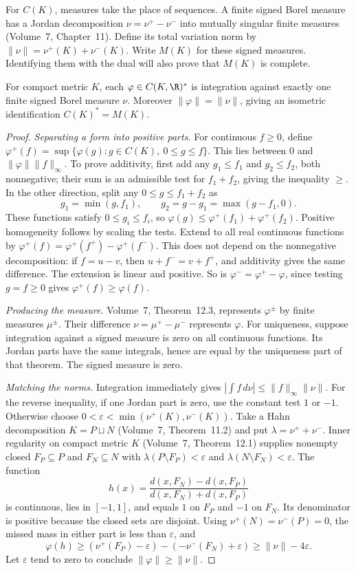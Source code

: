 For $C(K)$, measures take the place of sequences. A finite signed Borel measure has a Jordan decomposition $\nu=\nu^+-\nu^-$ into mutually singular finite measures (Volume~7, Chapter~11). Define its total variation norm by $\|\nu\|=\nu^+(K)+\nu^-(K)$. Write $M(K)$ for these signed measures. Identifying them with the dual will also prove that $M(K)$ is complete.

\begin{theorem}\label{thm:rieszmarkov}
For compact metric $K$, each $\varphi\in C(K,\R)^*$ is integration against exactly one finite signed Borel measure $\nu$. Moreover $\|\varphi\|=\|\nu\|$, giving an isometric identification $C(K)^*=M(K)$.
\end{theorem}
\begin{proof}
\emph{Separating a form into positive parts.} For continuous $f\ge0$, define $\varphi^+(f)=\sup\{\varphi(g):g\in C(K),\ 0\le g\le f\}$. This lies between $0$ and $\|\varphi\|\|f\|_\infty$. To prove additivity, first add any $g_1\le f_1$ and $g_2\le f_2$, both nonnegative; their sum is an admissible test for $f_1+f_2$, giving the inequality $\ge$. In the other direction, split any $0\le g\le f_1+f_2$ as
\[g_1=\min(g,f_1),\qquad g_2=g-g_1=\max(g-f_1,0).\]
These functions satisfy $0\le g_i\le f_i$, so $\varphi(g)\le\varphi^+(f_1)+\varphi^+(f_2)$. Positive homogeneity follows by scaling the tests. Extend to all real continuous functions by $\varphi^+(f)=\varphi^+(f^+)-\varphi^+(f^-)$. This does not depend on the nonnegative decomposition: if $f=u-v$, then $u+f^-=v+f^+$, and additivity gives the same difference. The extension is linear and positive. So is $\varphi^-=\varphi^+-\varphi$, since testing $g=f\ge0$ gives $\varphi^+(f)\ge\varphi(f)$.

\emph{Producing the measure.} Volume~7, Theorem~12.3, represents $\varphi^\pm$ by finite measures $\mu^\pm$. Their difference $\nu=\mu^+-\mu^-$ represents $\varphi$. For uniqueness, suppose integration against a signed measure is zero on all continuous functions. Its Jordan parts have the same integrals, hence are equal by the uniqueness part of that theorem. The signed measure is zero.

\emph{Matching the norms.} Integration immediately gives $|\int f\,d\nu|\le\|f\|_\infty\|\nu\|$. For the reverse inequality, if one Jordan part is zero, use the constant test $1$ or $-1$. Otherwise choose $0<\varepsilon<\min(\nu^+(K),\nu^-(K))$. Take a Hahn decomposition $K=P\sqcup N$ (Volume~7, Theorem~11.2) and put $\lambda=\nu^++\nu^-$. Inner regularity on compact metric $K$ (Volume~7, Theorem~12.1) supplies nonempty closed $F_P\subseteq P$ and $F_N\subseteq N$ with $\lambda(P\setminus F_P)<\varepsilon$ and $\lambda(N\setminus F_N)<\varepsilon$. The function
\[h(x)=\frac{d(x,F_N)-d(x,F_P)}{d(x,F_N)+d(x,F_P)}\]
is continuous, lies in $[-1,1]$, and equals $1$ on $F_P$ and $-1$ on $F_N$. Its denominator is positive because the closed sets are disjoint. Using $\nu^+(N)=\nu^-(P)=0$, the missed mass in either part is less than $\varepsilon$, and
\[\varphi(h)\ge(\nu^+(F_P)-\varepsilon)-(-\nu^-(F_N)+\varepsilon)\ge\|\nu\|-4\varepsilon.\]
Let $\varepsilon$ tend to zero to conclude $\|\varphi\|\ge\|\nu\|$.
\end{proof}

